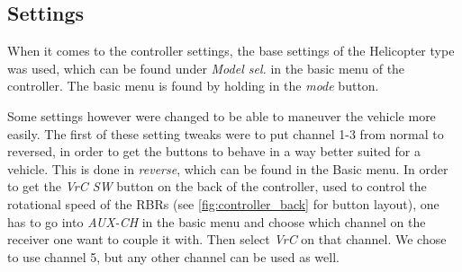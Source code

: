 \subsection{Settings}
When it comes to the controller settings, the base settings of the Helicopter type was used, which can be found under \textit{Model sel.} in the basic
menu of the controller. The basic menu is found by holding in the \textit{mode}
button.

Some settings however were changed to be able to maneuver the vehicle
more easily. The first of these setting tweaks were to put channel 1-3 from
normal to reversed, in order to get the buttons to behave in a way better
suited for a vehicle. This is done in \textit{reverse}, which can be found in the
Basic menu. In order to get the \textit{VrC SW} button on the back of the
controller, used to control the rotational speed of the RBRs (see
\cref{fig:controller_back} for button layout), one has to go into
\textit{AUX-CH} in the basic menu and choose which channel on the receiver one want to couple
it with. Then select \textit{VrC} on that channel. We chose to use channel 5,
but any other channel can be used as well.
